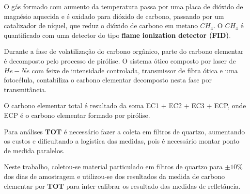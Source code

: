 O gás formado com aumento da temperatura passa por uma placa de dióxido de magnésio 
aquecida e é oxidado para dióxido de carbono, passando por um catalizador de níquel, 
que reduz o dióxido de carbono em metano $CH_4$.
O $CH_4$ é quantificado com uma detector do tipo 
\textbf{flame ionization detector (FID)}.

Durante a fase de volatilização do carbono orgânico, parte do carbono elementar
é decomposto pelo processo de pirólise. 
O sistema ótico composto por laser de $He-Ne$ com feixe de intensidade controlada, 
transmissor de fibra ótica e uma fotocélula, contabiliza o carbono elementar
decomposto nesta fase por transmitância.

O carbono elementar total é resultado da soma EC1 + EC2 + EC3 + ECP,
onde ECP é o carbono elementar formado por pirólise. 

Para análises \textbf{TOT} é necessário fazer a coleta em filtros
de quartzo, aumentando os custos e dificultando a logística das medidas, 
pois é necessário montar ponto de medida paralelos.  

Neste trabalho, coletou-se material particulado em filtros de 
quartzo para $\pm 10\%$ dos dias de amostragem e utilizou-se
dos resultados da medida de carbono elementar por \textbf{TOT} 
para inter-calibrar os resultado das medidas de refletância. 
